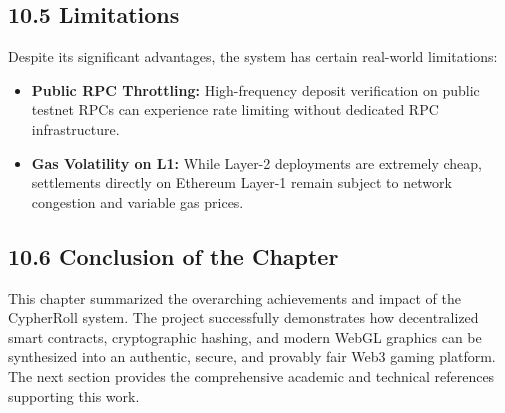 \subsection*{10.5 Limitations}
Despite its significant advantages, the system has certain real-world limitations:
\begin{itemize}[leftmargin=1.5em]
    \item \textbf{Public RPC Throttling:} High-frequency deposit verification on public testnet RPCs can experience rate limiting without dedicated RPC infrastructure.
    \item \textbf{Gas Volatility on L1:} While Layer-2 deployments are extremely cheap, settlements directly on Ethereum Layer-1 remain subject to network congestion and variable gas prices.
\end{itemize}

\subsection*{10.6 Conclusion of the Chapter}
This chapter summarized the overarching achievements and impact of the CypherRoll system. The project successfully demonstrates how decentralized smart contracts, cryptographic hashing, and modern WebGL graphics can be synthesized into an authentic, secure, and provably fair Web3 gaming platform. The next section provides the comprehensive academic and technical references supporting this work.
\label{chap:conclusion_end}
